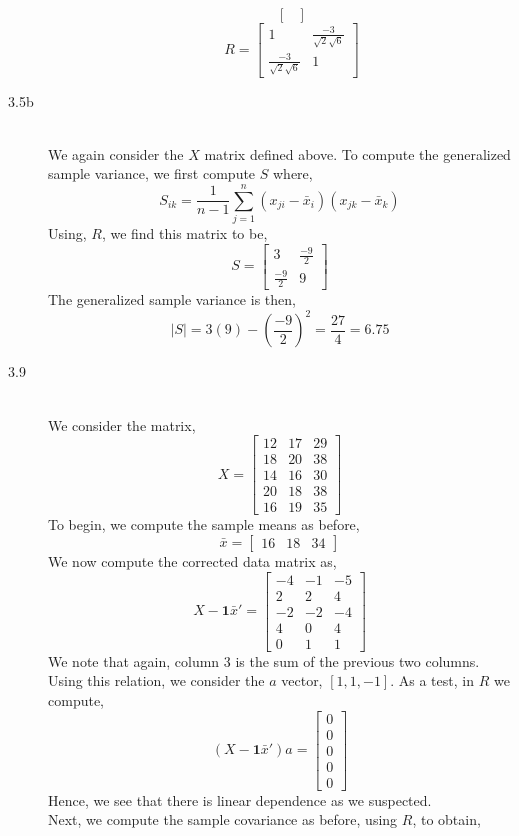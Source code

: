 \documentclass[letterpaper,10pt]{article}
\begin{document}
\begin{description}
\begin{enumerate}[label=\alph*.]
\[\begin{bmatrix}
\end{bmatrix} \]
\[R=\begin{bmatrix}
1 & \frac{-3}{\sqrt{2}\sqrt{6}}\\
\frac{-3}{\sqrt{2}\sqrt{6}} & 1
\end{bmatrix} \]
\end{enumerate}
\item[3.5b]\hfill \\
We again consider the $X$ matrix defined above. To compute the generalized sample variance, we first compute $S$ where,
\[S_{ik}=\frac{1}{n-1}\sum_{j=1}^n(x_{ji}-\bar{x}_i)(x_{jk}-\bar{x}_k)\]
Using, $R$, we find this matrix to be,
\[S=\begin{bmatrix}
3 & \frac{-9}{2}\\
\frac{-9}{2} & 9
\end{bmatrix} \]
The generalized sample variance is then,
\[|S|=3(9)-(\frac{-9}{2})^2=\frac{27}{4}=6.75\]
\item[3.9]\hfill\\
We consider the matrix,
\[X=\begin{bmatrix}
12 & 17 & 29\\
18 & 20 & 38\\
14 & 16 & 30\\
20 & 18 & 38\\
16 & 19 & 35
\end{bmatrix} \]
To begin, we compute the sample means as before,
\[\bar{x}=\begin{bmatrix}
16 & 18 & 34
\end{bmatrix}\]
We now compute the corrected data matrix as,
\[X-\textbf{1}\bar{x}'=\begin{bmatrix}
-4 & -1 & -5\\
2 & 2 & 4\\
-2 & -2 & -4\\
4 & 0 & 4\\
0 & 1 & 1
\end{bmatrix} \]
We note that again, column 3 is the sum of the previous two columns. Using this relation, we consider the $a$ vector, $[1,1,-1]$. As a test, in $R$ we compute,
\[(X-\textbf{1}\bar{x}')a=\begin{bmatrix}
0\\0\\0\\0\\0
\end{bmatrix}\]
Hence, we see that there is linear dependence as we suspected.\\
Next, we compute the sample covariance as before, using $R$, to obtain,

\end{description}
\end{document}
